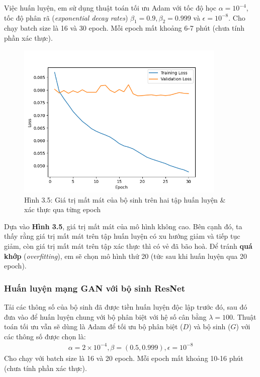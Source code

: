 \documentclass[a4paper]{article}
\begin{document}
\noindent
Việc huấn luyện, em sử dụng thuật toán tối ưu Adam với tốc độ học $\alpha =  10^{-4}$, tốc độ phân rã (\textit{exponential decay rates}) $\beta_1 = 0.9, \beta_2 = 0.999$ và $\epsilon = 10^{-8}$. Cho chạy batch size là 16 và 30 epoch. Mỗi epoch mất khoảng 6-7 phút (chưa tính phần xác thực).

\begin{figure}[h!]
\centering
\includegraphics[width=10cm]{images/3_5.png}
\caption{Hình 3.5: Giá trị mất mát của bộ sinh trên hai tập huấn luyện \& xác thực qua từng epoch}
\end{figure}

\noindent
Dựa vào \textbf{Hình 3.5}, giá trị mất mát của mô hình không cao. Bên cạnh đó, ta thấy rằng giá trị mất mát trên tập huấn luyện có xu hướng giảm và tiếp tục giảm, còn giá trị mất mát trên tập xác thực thì có vẻ đã bão hoà. Để tránh \textbf{quá khớp} (\textit{overfitting}), em sẽ chọn mô hình thứ 20 (tức sau khi huấn luyện qua 20 epoch).

\subsubsection{Huấn luyện mạng GAN với bộ sinh ResNet}
Tải các thông số của bộ sinh đã được tiền huấn luyện độc lập trước đó, sau đó đưa vào để huấn luyện chung với bộ phân biệt với hệ số cân bằng $\lambda = 100$. Thuật toán tối ưu vẫn sẽ dùng là Adam để tối ưu bộ phân biệt ($D$) và bộ sinh ($G$) với các thông số được chọn là:
\begin{align*}
\alpha = 2\times 10^{-4}, \beta = (0.5, 0.999), \epsilon = 10^{-8}
\end{align*}
Cho chạy với batch size là 16 và 20 epoch. Mỗi epoch mất khoảng 10-16 phút (chưa tính phần xác thực).
\end{document}

